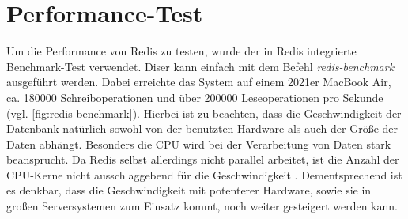 
\section{Performance-Test}
\label{sec:Performance}
Um die Performance von Redis zu testen, wurde der in Redis integrierte Benchmark-Test verwendet.
Diser kann einfach mit dem Befehl \textit{redis-benchmark} ausgeführt werden.
Dabei erreichte das System auf einem 2021er MacBook Air, ca. 180000 Schreiboperationen und über 200000 Leseoperationen pro Sekunde (vgl. \autoref{fig:redis-benchmark}).
Hierbei ist zu beachten, dass die Geschwindigkeit der Datenbank natürlich sowohl von der benutzten Hardware als auch der Größe der Daten abhängt.
Besonders die CPU wird bei der Verarbeitung von Daten stark beansprucht. Da Redis selbst allerdings nicht parallel arbeitet, ist die Anzahl der CPU-Kerne nicht ausschlaggebend für die Geschwindigkeit \cite{Redis-Docs-Benchmarks}.
Dementsprechend ist es denkbar, dass die Geschwindigkeit mit potenterer Hardware, sowie sie in großen Serversystemen zum Einsatz kommt, noch weiter gesteigert werden kann.
